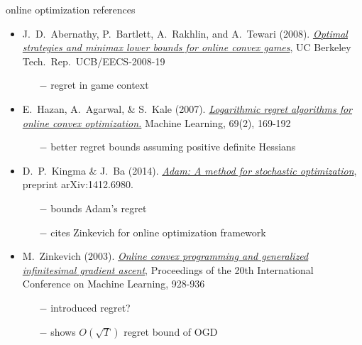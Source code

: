 \documentclass[xcolor={svgnames},
               hyperref={colorlinks,citecolor=DeepPink4,linkcolor=FireBrick,urlcolor=Maroon}]
               {beamer}
\begin{document}
\begin{frame}{online optimization references}

\begin{itemize}
\footnotesize
\item J.~D.~Abernathy, P.~Bartlett, A.~Rakhlin, and A.~Tewari (2008). \href{https://www2.eecs.berkeley.edu/Pubs/TechRpts/2008/EECS-2008-19.pdf}{\emph{Optimal strategies and minimax lower bounds for online convex games}}, UC Berkeley Tech.~Rep.~UCB/EECS-2008-19
    \begin{itemize}
    \scriptsize
    \item[$-$] regret in game context
    \end{itemize}
\item E.~Hazan, A.~Agarwal, \& S.~Kale (2007).  \href{https://link.springer.com/content/pdf/10.1007/s10994-007-5016-8.pdf}{\emph{Logarithmic regret algorithms for online convex optimization.}} Machine Learning, 69(2), 169-192
    \begin{itemize}
    \scriptsize
    \item[$-$] better regret bounds assuming positive definite Hessians
    \end{itemize}
\item D.~P.~Kingma \& J.~Ba (2014). \href{https://arxiv.org/abs/1412.6980}{\emph{Adam: A method for stochastic optimization}}, preprint arXiv:1412.6980.
    \begin{itemize}
    \scriptsize
    \item[$-$] bounds Adam's regret
    \item[$-$] cites Zinkevich for online optimization framework
    \end{itemize}
\item M.~Zinkevich (2003). \href{https://www.aaai.org/Papers/ICML/2003/ICML03-120.pdf}{\emph{Online convex programming and generalized infinitesimal gradient ascent}}, Proceedings of the 20th International Conference on Machine Learning, 928-936
    \begin{itemize}
    \scriptsize
    \item[$-$] introduced regret?
    \item[$-$] shows $O(\sqrt{T})$ regret bound of OGD
    \end{itemize}
\end{itemize}
\end{frame}
\end{document}
